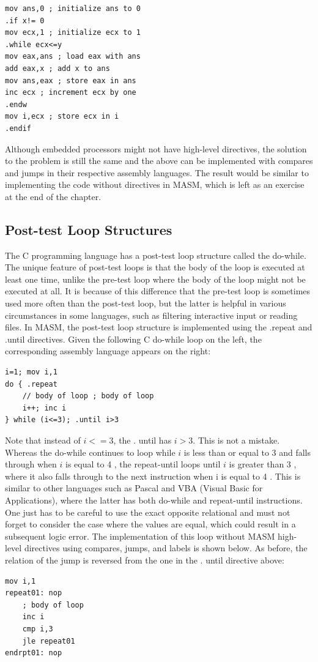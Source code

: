 \documentclass[10pt]{book}
\begin{document}
\begin{verbatim}
mov ans,0 ; initialize ans to 0
.if x!= 0
mov ecx,1 ; initialize ecx to 1
.while ecx<=y
mov eax,ans ; load eax with ans
add eax,x ; add x to ans
mov ans,eax ; store eax in ans
inc ecx ; increment ecx by one
.endw
mov i,ecx ; store ecx in i
.endif
\end{verbatim}

Although embedded processors might not have high-level directives, the solution to the problem is still the same and the above can be implemented with compares and jumps in their respective assembly languages. The result would be similar to implementing the code without directives in MASM, which is left as an exercise at the end of the chapter.

\subsection{Post-test Loop Structures}
The C programming language has a post-test loop structure called the do-while. The unique feature of post-test loops is that the body of the loop is executed at least one time, unlike the pre-test loop where the body of the loop might not be executed at all. It is because of this difference that the pre-test loop is sometimes used more often than the post-test loop, but the latter is helpful in various circumstances in some languages, such as filtering interactive input or reading files. In MASM, the post-test loop structure is implemented using the .repeat and .until directives. Given the following C do-while loop on the left, the corresponding assembly language appears on the right:

\begin{verbatim}
i=1; mov i,1
do { .repeat
    // body of loop ; body of loop
    i++; inc i
} while (i<=3); .until i>3
\end{verbatim}

Note that instead of $i<=3$, the . until has $i>3$. This is not a mistake. Whereas the do-while continues to loop while $i$ is less than or equal to 3 and falls through when $i$ is equal to 4 , the repeat-until loops until $i$ is greater than 3 , where it also falls through to the next instruction when i is equal to 4 . This is similar to other languages such as Pascal and VBA (Visual Basic for Applications), where the latter has both do-while and repeat-until instructions. One just has to be careful to use the exact opposite relational and must not forget to consider the case where the values are equal, which could result in a subsequent logic error. The implementation of this loop without MASM high-level directives using compares, jumps, and labels is shown below. As before, the relation of the jump is reversed from the one in the . until directive above:
\begin{verbatim}
mov i,1
repeat01: nop
    ; body of loop
    inc i
    cmp i,3
    jle repeat01
endrpt01: nop
\end{verbatim}
\end{document}
